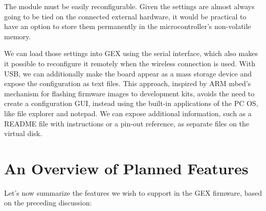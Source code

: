 The module must be easily reconfigurable. Given the settings are almost always going to be tied on the connected external hardware, it would be practical to have an option to store them permanently in the microcontroller's non-volatile memory.

We can load those settings into GEX using the serial interface, which also makes it possible to reconfigure it remotely when the wireless connection is used. With USB, we can additionally make the board appear as a mass storage device and expose the configuration as text files. This approach, inspired by ARM mbed's mechanism for flashing firmware images to development kits, avoids the need to create a configuration \gls{GUI}, instead using the built-in applications of the \gls{PC} \gls{OS}, like file explorer and notepad. We can expose additional information, such as a README file with instructions or a pin-out reference, as separate files on the virtual disk.

\section{An Overview of Planned Features}

Let's now summarize the features we wish to support in the GEX firmware, based on the preceding discussion:

